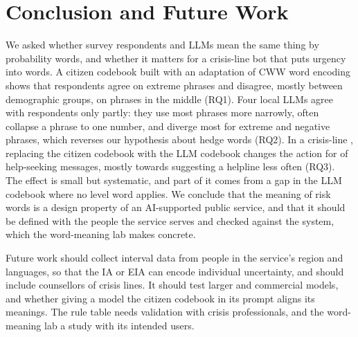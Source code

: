 \section{Conclusion and Future Work}
\label{sec:conclusion}

We asked whether survey respondents and LLMs mean the same thing by probability words, and whether it matters for a
crisis-line bot that puts urgency into words.
A citizen codebook built with an adaptation of CWW word encoding shows that respondents agree on extreme phrases and
disagree, mostly between demographic groups, on phrases in the middle (RQ1).
Four local LLMs agree with respondents only partly: they use most phrases more narrowly, often collapse a phrase to one
number, and diverge most for extreme and negative phrases, which reverses our hypothesis about hedge words (RQ2).
In a crisis-line \Perc{}, replacing the citizen codebook with the LLM codebook changes the action for
\WthreeNFlips{} of \WthreeNItems{} help-seeking messages, mostly towards suggesting a helpline less often (RQ3).
The effect is small but systematic, and part of it comes from a gap in the LLM codebook where no level word applies.
We conclude that the meaning of risk words is a design property of an AI-supported public service, and that it should be
defined with the people the service serves and checked against the system, which the word-meaning lab makes concrete.

Future work should collect interval data from people in the service's region and languages, so that the IA or EIA can
encode individual uncertainty, and should include counsellors of crisis lines.
It should test larger and commercial models, and whether giving a model the citizen codebook in its prompt aligns its
meanings.
The rule table needs validation with crisis professionals, and the word-meaning lab a study with its intended users.
